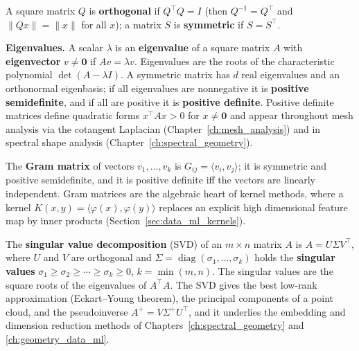 A square matrix $Q$ is \textbf{orthogonal} if $Q^\top Q = I$ (then $Q^{-1} = Q^\top$
and $\|Qx\| = \|x\|$ for all $x$); a matrix $S$ is \textbf{symmetric} if
$S = S^\top$.

\medskip
\noindent\textbf{Eigenvalues.}
A scalar $\lambda$ is an \textbf{eigenvalue} of a square matrix $A$ with
\textbf{eigenvector} $v \neq \mathbf{0}$ if $Av = \lambda v$. Eigenvalues are
the roots of the characteristic polynomial $\det(A - \lambda I)$.
A symmetric matrix has $d$ real eigenvalues and an orthonormal eigenbasis;
if all eigenvalues are nonnegative it is \textbf{positive semidefinite}, and
if all are positive it is \textbf{positive definite}. Positive definite
matrices define quadratic forms $x^\top A x > 0$ for $x \neq \mathbf{0}$ and
appear throughout mesh analysis via the cotangent Laplacian
(Chapter~\ref{ch:mesh_analysis}) and in spectral shape analysis
(Chapter~\ref{ch:spectral_geometry}).

The \textbf{Gram matrix} of vectors $v_1,\dots,v_k$ is
$G_{ij} = \langle v_i, v_j \rangle$; it is symmetric and positive semidefinite,
and it is positive definite iff the vectors are linearly independent. Gram
matrices are the algebraic heart of kernel methods, where a kernel
$K(x,y) = \langle \varphi(x), \varphi(y) \rangle$ replaces an explicit high
dimensional feature map by inner products (Section~\ref{sec:data_ml_kernels}).

The \textbf{singular value decomposition} (SVD) of an $m \times n$ matrix $A$
is $A = U \Sigma V^\top$, where $U$ and $V$ are orthogonal and
$\Sigma = \operatorname{diag}(\sigma_1,\dots,\sigma_k)$ holds the
\textbf{singular values} $\sigma_1 \ge \sigma_2 \ge \cdots \ge \sigma_k \ge 0$,
$k = \min(m,n)$. The singular values are the square roots of the eigenvalues
of $A^\top A$. The SVD gives the best low-rank approximation (Eckart--Young
theorem), the principal components of a point cloud, and the pseudoinverse
$A^+ = V \Sigma^+ U^\top$, and it underlies the embedding and dimension
reduction methods of Chapters~\ref{ch:spectral_geometry} and
\ref{ch:geometry_data_ml}.

